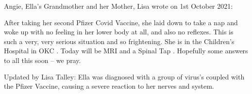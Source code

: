 Angie, Ella’s Grandmother and her Mother, Lisa wrote on 1st October 2021:

After taking her second Pfizer Covid Vaccine, she laid down to take a nap and
woke up with no feeling in her lower body at all, and also no reflexes. This is
such a very, very serious situation and so frightening. She is in the Children’s
Hospital in OKC . Today will be MRI and a Spinal Tap . Hopefully some answers to
all this soon – we pray.

Updated by Lisa Talley: Ella was diagnosed with a group of virus’s coupled with
the Pfizer Vaccine, causing a severe reaction to her nerves and system.
